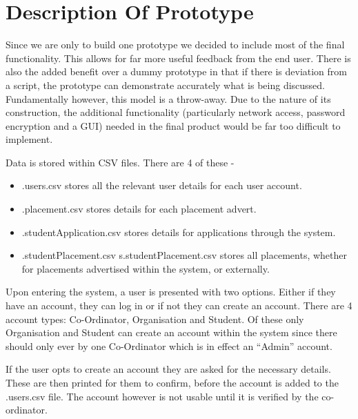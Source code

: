 \documentclass{article}
\begin{document}
\section{Description Of Prototype}

\begin{flushleft}
Since we are only to build one prototype we decided to include most
of the final functionality. This allows for far more useful feedback
from the end user. There is also the added benefit over a dummy prototype
in that if there is deviation from a script, the prototype can demonstrate
accurately what is being discussed. Fundamentally however, this model
is a throw-away. Due to the nature of its construction, the additional
functionality (particularly network access, password encryption and
a GUI) needed in the final product would be far too difficult to implement.
\par\end{flushleft}

\begin{flushleft}
Data is stored within CSV files. There are 4 of these - 
\par\end{flushleft}
\begin{itemize}
\item .users.csv stores all the relevant user details for each user account.
\item .placement.csv stores details for each placement advert.
\item .studentApplication.csv stores details for applications through the
system.
\item .studentPlacement.csv s.studentPlacement.csv stores all placements,
whether for placements advertised within the system, or externally.
\end{itemize}
Upon entering the system, a user is presented with two options. Either
if they have an account, they can log in or if not they can create
an account. There are 4 account types: Co-Ordinator, Organisation
and Student. Of these only Organisation and Student can create an
account within the system since there should only ever by one Co-Ordinator
which is in effect an \textquotedblleft{}Admin\textquotedblright{}
account.

If the user opts to create an account they are asked for the necessary
details. These are then printed for them to confirm, before the account
is added to the .users.csv file. The account however is not usable
until it is verified by the co-ordinator.
\end{document}
